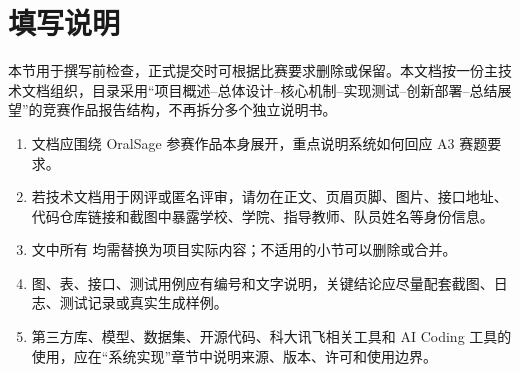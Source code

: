 \section*{填写说明}

本节用于撰写前检查，正式提交时可根据比赛要求删除或保留。本文档按一份主技术文档组织，目录采用“项目概述--总体设计--核心机制--实现测试--创新部署--总结展望”的竞赛作品报告结构，不再拆分多个独立说明书。

\begin{enumerate}
  \item 文档应围绕 OralSage 参赛作品本身展开，重点说明系统如何回应 A3 赛题要求。
  \item 若技术文档用于网评或匿名评审，请勿在正文、页眉页脚、图片、接口地址、代码仓库链接和截图中暴露学校、学院、指导教师、队员姓名等身份信息。
  \item 文中所有  均需替换为项目实际内容；不适用的小节可以删除或合并。
  \item 图、表、接口、测试用例应有编号和文字说明，关键结论应尽量配套截图、日志、测试记录或真实生成样例。
  \item 第三方库、模型、数据集、开源代码、科大讯飞相关工具和 AI Coding 工具的使用，应在“系统实现”章节中说明来源、版本、许可和使用边界。
\end{enumerate}

